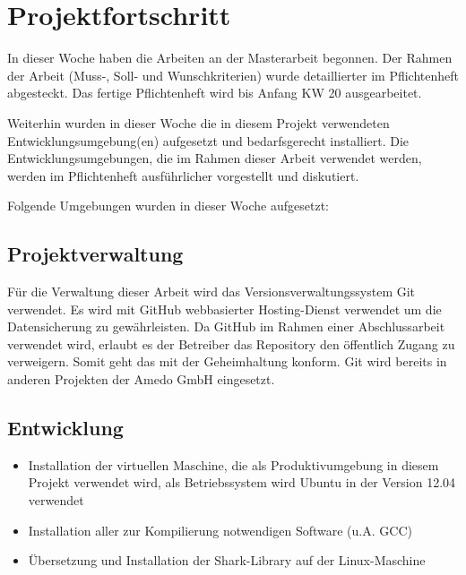 \documentclass[a4paper,12pt,fleqn]{scrartcl}
\begin{document}
\section[Fortschritt]{Projektfortschritt}
In dieser Woche haben die Arbeiten an der Masterarbeit begonnen. Der Rahmen der Arbeit (Muss-, Soll- und Wunschkriterien)
wurde detaillierter im Pflichtenheft abgesteckt. Das fertige Pflichtenheft wird bis Anfang KW 20 ausgearbeitet.

Weiterhin wurden in dieser Woche die in diesem Projekt verwendeten Entwicklungsumgebung(en) aufgesetzt und bedarfsgerecht
installiert. Die Entwicklungsumgebungen, die im Rahmen dieser Arbeit verwendet werden, werden im Pflichtenheft ausführlicher vorgestellt und diskutiert.

Folgende Umgebungen wurden in dieser Woche aufgesetzt:

\subsection{Projektverwaltung}
Für die Verwaltung dieser Arbeit wird das Versionsverwaltungssystem Git verwendet. Es wird mit GitHub \cite{github} webbasierter
Hosting-Dienst verwendet um die Datensicherung zu gewährleisten. Da GitHub im Rahmen einer Abschlussarbeit verwendet wird, erlaubt
es der Betreiber das Repository den öffentlich Zugang zu verweigern. Somit geht das mit der Geheimhaltung konform. Git wird bereits
in anderen Projekten der Amedo GmbH eingesetzt.

\subsection{Entwicklung}
\begin{itemize}
  \item Installation der virtuellen Maschine, die als Produktivumgebung in
      diesem Projekt verwendet wird, als Betriebssystem wird Ubuntu in der Version 12.04 verwendet
  \item Installation aller zur Kompilierung notwendigen Software (u.A. GCC)
  \item Übersetzung und Installation der Shark-Library auf der Linux-Maschine
\end{itemize}

\end{document}
